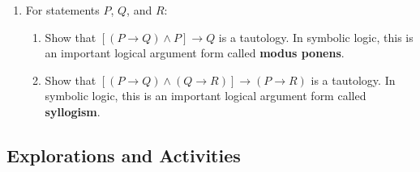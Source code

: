 \begin{enumerate}
\item For statements $P$, $Q$, and $R$:
\begin{enumerate}
  \item Show that 
$\left[ (P \to Q) \wedge P \right] \to Q$ is a tautology.  \note In symbolic logic, this is an important logical argument form called \textbf{modus ponens}.
%
  \item Show that $\left[ (P \to Q) \wedge (Q \to R) \right] \to (P \to R)$ is a tautology.  \note In symbolic logic, this is an important logical argument form called \textbf{syllogism}.
%
\end{enumerate}
\end{enumerate}



\subsection*{Explorations and Activities}
\setcounter{oldenumi}{\theenumi}
